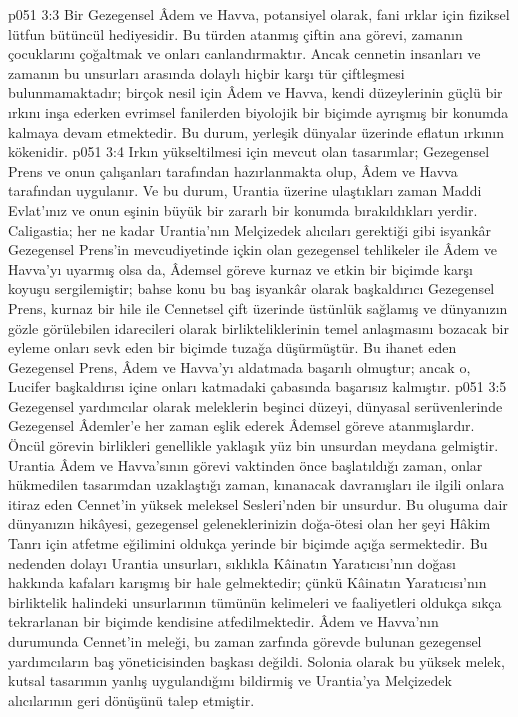 \vs p051 3:3 Bir Gezegensel Âdem ve Havva, potansiyel olarak, fani ırklar için fiziksel lütfun bütüncül hediyesidir. Bu türden atanmış çiftin ana görevi, zamanın çocuklarını çoğaltmak ve onları canlandırmaktır. Ancak cennetin insanları ve zamanın bu unsurları arasında dolaylı hiçbir karşı tür çiftleşmesi bulunmamaktadır; birçok nesil için Âdem ve Havva, kendi düzeylerinin güçlü bir ırkını inşa ederken evrimsel fanilerden biyolojik bir biçimde ayrışmış bir konumda kalmaya devam etmektedir. Bu durum, yerleşik dünyalar üzerinde eflatun ırkının kökenidir.
\vs p051 3:4 Irkın yükseltilmesi için mevcut olan tasarımlar; Gezegensel Prens ve onun çalışanları tarafından hazırlanmakta olup, Âdem ve Havva tarafından uygulanır. Ve bu durum, Urantia üzerine ulaştıkları zaman Maddi Evlat’ınız ve onun eşinin büyük bir zararlı bir konumda bırakıldıkları yerdir. Caligastia; her ne kadar Urantia’nın Melçizedek alıcıları gerektiği gibi isyankâr Gezegensel Prens’in mevcudiyetinde içkin olan gezegensel tehlikeler ile Âdem ve Havva’yı uyarmış olsa da, Âdemsel göreve kurnaz ve etkin bir biçimde karşı koyuşu sergilemiştir; bahse konu bu baş isyankâr olarak başkaldırıcı Gezegensel Prens, kurnaz bir hile ile Cennetsel çift üzerinde üstünlük sağlamış ve dünyanızın gözle görülebilen idarecileri olarak birlikteliklerinin temel anlaşmasını bozacak bir eyleme onları sevk eden bir biçimde tuzağa düşürmüştür. Bu ihanet eden Gezegensel Prens, Âdem ve Havva’yı aldatmada başarılı olmuştur; ancak o, Lucifer başkaldırısı içine onları katmadaki çabasında başarısız kalmıştır.
\vs p051 3:5 Gezegensel yardımcılar olarak meleklerin beşinci düzeyi, dünyasal serüvenlerinde Gezegensel Âdemler’e her zaman eşlik ederek Âdemsel göreve atanmışlardır. Öncül görevin birlikleri genellikle yaklaşık yüz bin unsurdan meydana gelmiştir. Urantia Âdem ve Havva’sının görevi vaktinden önce başlatıldığı zaman, onlar hükmedilen tasarımdan uzaklaştığı zaman, kınanacak davranışları ile ilgili onlara itiraz eden Cennet’in yüksek meleksel Sesleri’nden bir unsurdur. Bu oluşuma dair dünyanızın hikâyesi, gezegensel geleneklerinizin doğa\hyp{}ötesi olan her şeyi Hâkim Tanrı için atfetme eğilimini oldukça yerinde bir biçimde açığa sermektedir. Bu nedenden dolayı Urantia unsurları, sıklıkla Kâinatın Yaratıcısı’nın doğası hakkında kafaları karışmış bir hale gelmektedir; çünkü Kâinatın Yaratıcısı’nın birliktelik halindeki unsurlarının tümünün kelimeleri ve faaliyetleri oldukça sıkça tekrarlanan bir biçimde kendisine atfedilmektedir. Âdem ve Havva’nın durumunda Cennet’in meleği, bu zaman zarfında görevde bulunan gezegensel yardımcıların baş yöneticisinden başkası değildi. Solonia olarak bu yüksek melek, kutsal tasarımın yanlış uygulandığını bildirmiş ve Urantia’ya Melçizedek alıcılarının geri dönüşünü talep etmiştir.
